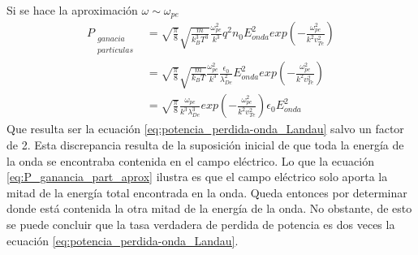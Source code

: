 \documentclass[../tesis_main_file.tex]{subfiles}
\begin{document}
Si se hace la aproximación $\omega \sim \omega_{pe}$
\begin{equation}
\label{eq:P_ganancia_part_aprox}
\begin{split}
P_{\substack{ganacia\\particulas} } &= \sqrt{\frac{\pi}{8}}\sqrt{\frac{m}{k^3_BT^3}}\frac{\omega ^2_{pe}}{k^3}q^2n_0E^2_{onda}exp\left( -\frac{\omega ^2_{pe}}{k^2v^2_{Te}}\right)\\
&=\sqrt{\frac{\pi}{8}}\sqrt{\frac{m}{k_BT}}\frac{\omega ^2_{pe}}{k^3}\frac{\epsilon _0}{\lambda ^2_{De}}E^2_{onda}exp\left( -\frac{\omega ^2_{pe}}{k^2v^2_{Te}}\right)\\
&=\sqrt{\frac{\pi}{8}}\frac{\omega _{pe}}{k^3\lambda ^3_{De}}exp\left( -\frac{\omega ^2_{pe}}{k^2v^2_{Te}}\right) \epsilon _0 E^2_{onda}
\end{split}
\end{equation}
Que resulta ser la ecuación \ref{eq:potencia_perdida-onda_Landau} salvo un factor de 2. Esta discrepancia resulta de la suposición inicial de que toda la energía de la onda se encontraba contenida en el campo eléctrico. Lo que la ecuación \ref{eq:P_ganancia_part_aprox} ilustra es que el campo eléctrico solo aporta la mitad de la energía total encontrada en la onda. Queda entonces por determinar donde está contenida la otra mitad de la energía de la onda. No obstante, de esto se puede concluir que la tasa verdadera de perdida de potencia es dos veces la ecuación \ref{eq:potencia_perdida-onda_Landau}.
\end{document}
